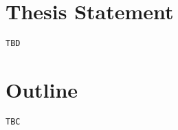 \section{Thesis Statement}
\label{sec:thesis-statement}
\texttt{TBD}

\section{Outline}
\label{sec:outline}
\texttt{TBC}